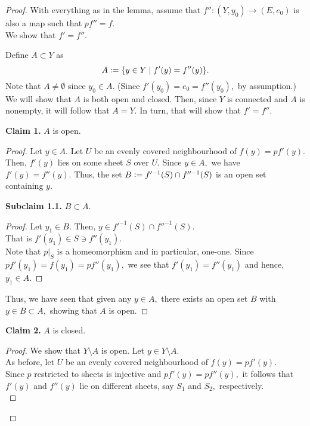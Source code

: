 \documentclass[12pt]{article}
\newenvironment{blockquote}
{\begin{mdframed}[skipabove=0pt, skipbelow=0pt, innertopmargin=4pt, innerbottommargin=4pt, bottomline=false,topline=false,rightline=false, linewidth=2pt]}
{\end{mdframed}}
\begin{document}
\begin{proof} 
	With everything as in the lemma, assume that $f'':(Y, y_0) \to (E, e_0)$ is also a map such that $pf'' = f.$\\
	We show that $f' = f''.$

	Define $A \subset Y$ as
	\begin{equation*} 
		A \vcentcolon= \{y \in Y \mid f'(y) = f''(y)\}.
	\end{equation*}
	Note that $A \neq \emptyset$ since $y_0 \in A.$ (Since $f'(y_0) = e_0 = f''(y_0),$ by assumption.)\\
	We will show that $A$ is both open and closed. Then, since $Y$ is connected and $A$ is nonempty, it will follow that $A = Y.$ In turn, that will show that $f' = f''.$\\
	\begin{blockquote}
		\textbf{Claim 1.} $A$ is open.
		\begin{proof} 
			Let $y \in A.$ Let $U$ be an evenly covered neighbourhood of $f(y) = pf'(y).$\\
			Then, $f'(y)$ lies on some sheet $S$ over $U.$ Since $y \in A,$ we have $f'(y) = f''(y).$ Thus, the set $B \vcentcolon= f'^{-1}(S) \cap f''^{-1}(S)$ is an open set containing $y.$\\
			\begin{blockquote}
				\textbf{Subclaim 1.1.} $B \subset A.$
				\begin{proof} 
					Let $y_1 \in B.$ Then, $y \in f'^{-1}(S) \cap f''^{-1}(S).$ \\
					That is $f'(y_1) \in S \ni f''(y_1).$\\
					Note that $p|_S$ is a homeomorphism and in particular, one-one. Since $pf'(y_1) = f(y_1) = pf''(y_1),$ we see that $f'(y_1) = f''(y_1)$ and hence, $y_1 \in A.$
				\end{proof}
			\end{blockquote}
			Thus, we have seen that given any $y \in A,$ there exists an open set $B$ with $y \in B \subset A,$ showing that $A$ is open.
		\end{proof}
	\end{blockquote}
	\begin{blockquote}
		\textbf{Claim 2.} $A$ is closed.
		\begin{proof} 
			We show that $Y\setminus A$ is open. Let $y \in Y\setminus A.$\\
			As before, let $U$ be an evenly covered neighbourhood of $f(y) = pf'(y).$\\
			Since $p$ restricted to sheets is injective and $pf'(y) = pf''(y),$ it follows that $f'(y)$ and $f''(y)$ lie on different sheets, say $S_1$ and $S_2,$ respectively.\\

\end{proof}
\end{blockquote}
\end{proof}
\end{document}
